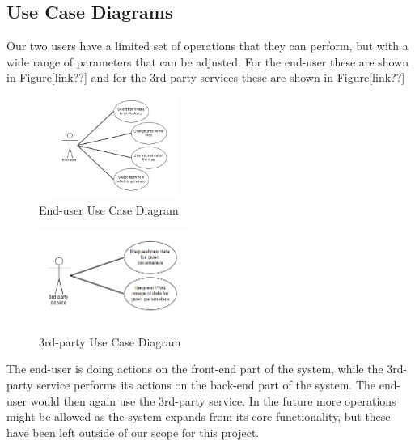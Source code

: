 \documentclass[11pt,a4paper,titlepage,oneside]{report}
\begin{document}
  \subsection{Use Case Diagrams}
  Our two users have a limited set of operations that they can perform, but with a wide range of parameters that can be adjusted. For the end-user these are shown in Figure[link??] and for the 3rd-party services these are shown in Figure[link??]
  \begin{figure}[h]
	\begin{center}
	\includegraphics[height=125px,width=186px]{img/useCase_EndUser.png}
	\caption{End-user Use Case Diagram}
	\label{fig:endUserUseDiagram}
	\small
	\end{center}
  \end{figure}

  \begin{figure}[h]
	\begin{center}
	\includegraphics[height=125px,width=186px]{img/useCase_3rdParty.png}
	\caption{3rd-party Use Case Diagram}
	\label{fig:3rdPartyUseDiagram}
	\small
	\end{center}
  \end{figure}

    The end-user is doing actions on the front-end part of the system, while the 3rd-party service performs its actions on the back-end part of the system. The end-user would then again use the 3rd-party service. In the future more operations might be allowed as the system expands from its core functionality, but these have been left outside of our scope for this project.
\end{document}
